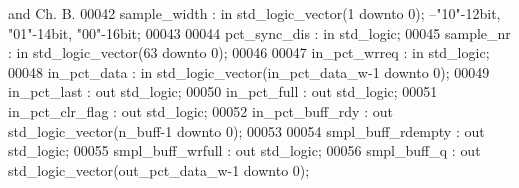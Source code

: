 \begin{DoxyCode}
{       and Ch. B. }
00042       \textcolor{vhdlchar}{sample_width}      \textcolor{vhdlchar}{:} \textcolor{keywordflow}{in} \textcolor{comment}{std\_logic\_vector}\textcolor{vhdlchar}{(}\textcolor{vhdllogic}{}\textcolor{vhdllogic}{1} \textcolor{keywordflow}{downto} \textcolor{vhdllogic}{}\textcolor{vhdllogic}{0}\textcolor{vhdlchar}{)};\textcolor{keyword}{ --"10"-12bit, "01"-14bit, "00"-16bit;}
00043       
00044       \textcolor{vhdlchar}{pct_sync_dis}      \textcolor{vhdlchar}{:} \textcolor{keywordflow}{in} \textcolor{comment}{std\_logic};
00045       \textcolor{vhdlchar}{sample_nr}         \textcolor{vhdlchar}{:} \textcolor{keywordflow}{in} \textcolor{comment}{std\_logic\_vector}\textcolor{vhdlchar}{(}\textcolor{vhdllogic}{}\textcolor{vhdllogic}{63} \textcolor{keywordflow}{downto} \textcolor{vhdllogic}{}\textcolor{vhdllogic}{0}\textcolor{vhdlchar}{)};
00046 
00047       \textcolor{vhdlchar}{in_pct_wrreq}      \textcolor{vhdlchar}{:} \textcolor{keywordflow}{in} \textcolor{comment}{std\_logic};
00048       \textcolor{vhdlchar}{in_pct_data}       \textcolor{vhdlchar}{:} \textcolor{keywordflow}{in} \textcolor{comment}{std\_logic\_vector}\textcolor{vhdlchar}{(}\textcolor{vhdlchar}{in_pct_data_w}\textcolor{vhdlchar}{-}\textcolor{vhdllogic}{}\textcolor{vhdllogic}{1} \textcolor{keywordflow}{downto} \textcolor{vhdllogic}{}\textcolor{vhdllogic}{0}\textcolor{vhdlchar}{)};
00049       \textcolor{vhdlchar}{in_pct_last}       \textcolor{vhdlchar}{:} \textcolor{keywordflow}{out} \textcolor{comment}{std\_logic};
00050       \textcolor{vhdlchar}{in_pct_full}       \textcolor{vhdlchar}{:} \textcolor{keywordflow}{out} \textcolor{comment}{std\_logic};
00051       \textcolor{vhdlchar}{in_pct_clr_flag}   \textcolor{vhdlchar}{:} \textcolor{keywordflow}{out} \textcolor{comment}{std\_logic};
00052       \textcolor{vhdlchar}{in_pct_buff_rdy}   \textcolor{vhdlchar}{:} \textcolor{keywordflow}{out} \textcolor{comment}{std\_logic\_vector}\textcolor{vhdlchar}{(}\textcolor{vhdlchar}{n_buff}\textcolor{vhdlchar}{-}\textcolor{vhdllogic}{}\textcolor{vhdllogic}{1} \textcolor{keywordflow}{downto} \textcolor{vhdllogic}{}\textcolor{vhdllogic}{0}\textcolor{vhdlchar}{)};
00053       
00054       \textcolor{vhdlchar}{smpl_buff_rdempty} \textcolor{vhdlchar}{:} \textcolor{keywordflow}{out} \textcolor{comment}{std\_logic};
00055       \textcolor{vhdlchar}{smpl_buff_wrfull}  \textcolor{vhdlchar}{:} \textcolor{keywordflow}{out} \textcolor{comment}{std\_logic};
00056       \textcolor{vhdlchar}{smpl_buff_q}       \textcolor{vhdlchar}{:} \textcolor{keywordflow}{out} \textcolor{comment}{std\_logic\_vector}\textcolor{vhdlchar}{(}\textcolor{vhdlchar}{out_pct_data_w}\textcolor{vhdlchar}{-}\textcolor{vhdllogic}{}\textcolor{vhdllogic}{1} \textcolor{keywordflow}{downto} \textcolor{vhdllogic}{}\textcolor{vhdllogic}{0}\textcolor{vhdlchar}{)};

\end{DoxyCode}
